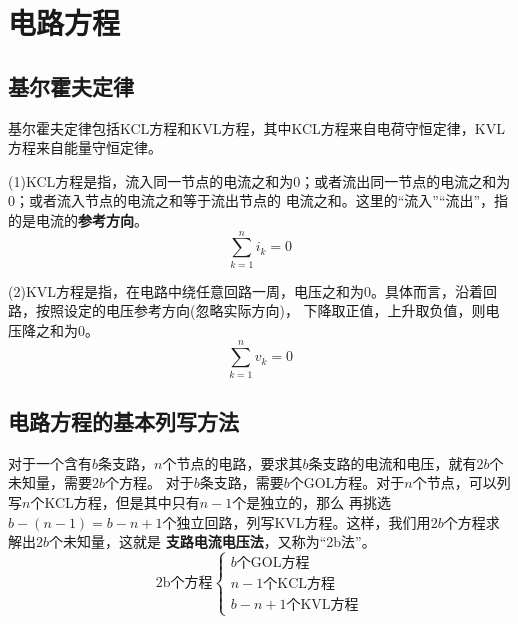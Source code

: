     \section{电路方程}
    \subsection{基尔霍夫定律}
    \par 基尔霍夫定律包括KCL方程和KVL方程，其中KCL方程来自电荷守恒定律，KVL方程来自能量守恒定律。
    \par (1)KCL方程是指，流入同一节点的电流之和为0；或者流出同一节点的电流之和为0；或者流入节点的电流之和等于流出节点的
    电流之和。这里的“流入”“流出”，指的是电流的\textbf{参考方向}。
    \[
    \sum_{k=1}^{n}i_k=0    
    \]
    \par (2)KVL方程是指，在电路中绕任意回路一周，电压之和为0。具体而言，沿着回路，按照设定的电压参考方向(忽略实际方向)，
    下降取正值，上升取负值，则电压降之和为0。
    \[
    \sum_{k=1}^{n}v_k=0    
    \]
    \subsection{电路方程的基本列写方法}
    \par 对于一个含有$b$条支路，$n$个节点的电路，要求其$b$条支路的电流和电压，就有$2b$个未知量，需要$2b$个方程。
    对于$b$条支路，需要$b$个GOL方程。对于$n$个节点，可以列写$n$个KCL方程，但是其中只有$n-1$个是独立的，那么
    再挑选$b-(n-1)=b-n+1$个独立回路，列写KVL方程。这样，我们用$2b$个方程求解出$2b$个未知量，这就是
    \textbf{支路电流电压法}，又称为“2b法”。
    $$\text{2b个方程}\begin{cases}
        b \text{个GOL方程}\\
        n-1 \text{个KCL方程}\\
        b-n+1 \text{个KVL方程}
    \end{cases}$$
